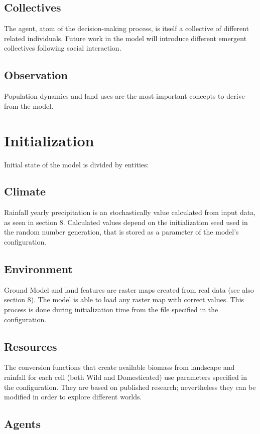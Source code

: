 \begin{enumerate}
\begin{enumerate}
\begin{enumeration}
\begin{enumerate}
\begin{enumerate}
\begin{enumerate}
\begin{enumerate}
\subsection{Collectives}
The agent, atom of the decision-making process, is itself a collective of different related individuals.
Future work in the model will introduce different emergent collectives following social interaction.
\subsection{Observation}
Population dynamics and land uses are the most important concepts to derive from the model.

\section{Initialization}
Initial state of the model is divided by entities:

\subsection{Climate}
Rainfall yearly precipitation is an stochastically value calculated from input data, as seen in section 8.
Calculated values depend on the initialization seed used in the random number generation, that is
stored as a parameter of the model's configuration.

\subsection{Environment}
Ground Model and land features are raster maps created from real data (see also section 8). The
model is able to load any raster map with correct values. This process is done during initialization time
from the file specified in the configuration.

\subsection{Resources}
The conversion functions that create available biomass from landscape and rainfall for each cell (both
Wild and Domesticated) use parameters specified in the configuration. They are based on published
research; nevertheless they can be modified in order to explore different worlds.

\subsection{Agents}


\end{enumerate}
\end{enumerate}
\end{enumerate}
\end{enumerate}
\end{enumeration}
\end{enumerate}
\end{enumerate}
